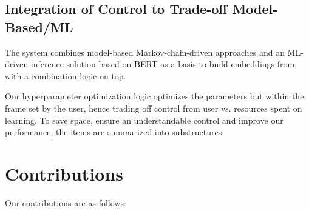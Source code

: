 \subsection{Integration of Control to Trade-off Model-Based/ML}
The system combines model-based Markov-chain-driven approaches and an ML-driven inference solution based on BERT as a basis to build embeddings from, with a combination logic on top.

Our hyperparameter optimization logic optimizes the parameters but within the frame set by the user, hence trading off control from user vs. resources spent on learning. To save space, ensure an understandable control and improve our performance, the items are summarized into substructures.

\section{Contributions}

Our contributions are as follows:


